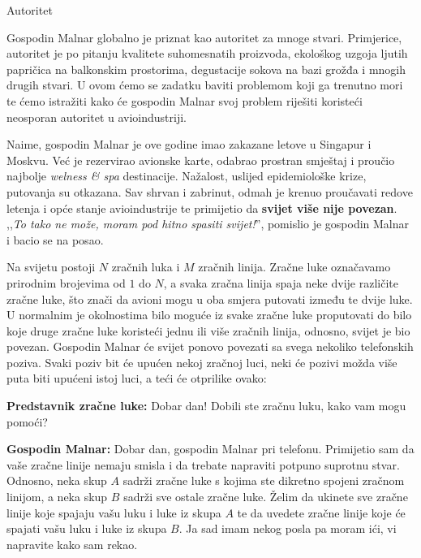 \begin{statement}[
  problempoints=100,
  timelimit=1 sekunda,
  memorylimit=512 MiB,
]{Autoritet}

Gospodin Malnar globalno je priznat kao autoritet za mnoge stvari. Primjerice,
autoritet je po pitanju kvalitete suhomesnatih proizvoda, ekološkog uzgoja
ljutih papričica na balkonskim prostorima, degustacije sokova na bazi grožđa
i mnogih drugih stvari.  U ovom ćemo se zadatku baviti problemom koji ga
trenutno mori te ćemo istražiti kako će gospodin Malnar svoj problem riješiti
koristeći neosporan autoritet u avioindustriji.

Naime, gospodin Malnar je ove godine imao zakazane letove u Singapur i Moskvu.
Već je rezervirao avionske karte, odabrao prostran smještaj i proučio
najbolje \textit{welness \& spa} destinacije. Nažalost, uslijed epidemiološke
krize, putovanja su otkazana. Sav shrvan i zabrinut, odmah je krenuo
proučavati redove letenja i opće stanje avioindustrije te primijetio da
\textbf{svijet više nije povezan}. ,,\textit{To tako ne može, moram pod hitno
spasiti svijet!}'', pomislio je gospodin Malnar i bacio se na posao.

Na svijetu postoji $N$ zračnih luka i $M$ zračnih linija. Zračne luke
označavamo prirodnim brojevima od $1$ do $N$, a svaka zračna linija spaja
neke dvije različite zračne luke, što znači da avioni mogu u oba smjera
putovati između te dvije luke. U normalnim je okolnostima bilo moguće iz
svake zračne luke proputovati do bilo koje druge zračne luke koristeći jednu
ili više zračnih linija, odnosno, svijet je bio povezan. Gospodin Malnar će
svijet ponovo povezati sa svega nekoliko telefonskih poziva. Svaki poziv bit
će upućen nekoj zračnoj luci, neki će pozivi možda više puta biti upućeni
istoj luci, a teći će otprilike ovako:

\textbf{Predstavnik zračne luke:} Dobar dan! Dobili ste zračnu luku, kako vam
mogu pomoći?

\textbf{Gospodin Malnar:} Dobar dan, gospodin Malnar pri telefonu. Primijetio
sam da vaše zračne linije nemaju smisla i da trebate napraviti potpuno
suprotnu stvar. Odnosno, neka skup $A$ sadrži zračne luke s kojima ste
dikretno spojeni zračnom linijom, a neka skup $B$ sadrži sve ostale zračne
luke. Želim da ukinete sve zračne linije koje spajaju vašu luku i luke iz
skupa $A$ te da uvedete zračne linije koje će spajati vašu luku i luke iz
skupa $B$. Ja sad imam nekog posla pa moram ići, vi napravite kako sam rekao.


\end{statement}
